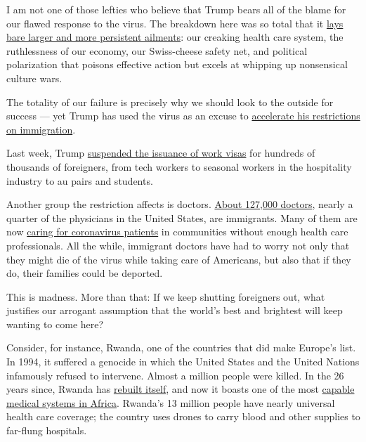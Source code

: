 I am not one of those lefties who believe that Trump bears all of the
blame for our flawed response to the virus. The breakdown here was so
total that it
\href{https://www.theatlantic.com/magazine/archive/2020/06/underlying-conditions/610261/}{lays
bare larger and more persistent ailments}: our creaking health care
system, the ruthlessness of our economy, our Swiss-cheese safety net,
and political polarization that poisons effective action but excels at
whipping up nonsensical culture wars.

The totality of our failure is precisely why we should look to the
outside for success --- yet Trump has used the virus as an excuse to
\href{https://www.nytimes3xbfgragh.onion/2020/06/12/us/politics/coronavirus-trump-immigration-policies.html}{accelerate
his restrictions on immigration}.

Last week, Trump
\href{https://www.nytimes3xbfgragh.onion/2020/06/22/us/politics/trump-h1b-work-visas.html}{suspended
the issuance of work visas} for hundreds of thousands of foreigners,
from tech workers to seasonal workers in the hospitality industry to au
pairs and students.

Another group the restriction affects is doctors.
\href{https://www.nbcnews.com/news/asian-america/fear-deportation-heightened-immigrant-doctors-h-1b-visas-amid-pandemic-n1204791}{About
127,000 doctors}, nearly a quarter of the physicians in the United
States, are immigrants. Many of them are now
\href{https://www.motherjones.com/coronavirus-updates/2020/06/immigrant-h1b-doctors-coronavirus-green-card/}{caring
for coronavirus patients} in communities without enough health care
professionals. All the while, immigrant doctors have had to worry not
only that they might die of the virus while taking care of Americans,
but also that if they do, their families could be deported.

This is madness. More than that: If we keep shutting foreigners out,
what justifies our arrogant assumption that the world's best and
brightest will keep wanting to come here?

Consider, for instance, Rwanda, one of the countries that did make
Europe's list. In 1994, it suffered a genocide in which the United
States and the United Nations infamously refused to intervene. Almost a
million people were killed. In the 26 years since, Rwanda has
\href{https://www.nytimes3xbfgragh.onion/2019/04/06/world/africa/rwanda-genocide-25-years.html}{rebuilt
itself}, and now it boasts one of the most
\href{https://www.atlanticcouncil.org/blogs/africasource/rwandas-successes-and-challenges-in-response-to-covid-19/}{capable
medical systems in Africa}. Rwanda's 13 million people have nearly
universal health care coverage; the country uses drones to carry blood
and other supplies to far-flung hospitals.

